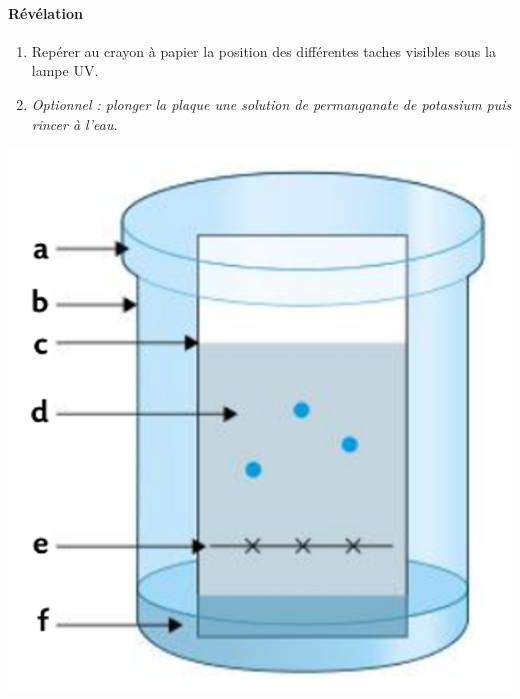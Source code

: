 \documentclass[12pt,a4paper,fleqn]{article}
\begin{document}
\begin{doc}
\begin{multicols}{2}
\paragraph{Révélation}
\begin{enumerate}[resume]
\item Repérer au crayon à papier la position des différentes taches visibles sous la lampe UV.
\item \emph{Optionnel : plonger la plaque une solution de permanganate de potassium puis rincer à l'eau}.
\end{enumerate}

\begin{center}
\includegraphics[width=\linewidth]{images/ccm_schema.png}
\end{center}
\end{multicols}
\end{doc}
\end{document}
